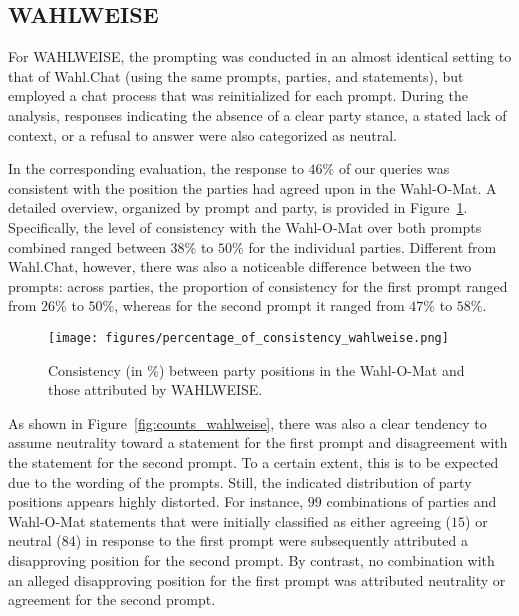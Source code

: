 \documentclass[
	fontsize=10pt,          %
	numbers=noenddot,    	%
    parskip=half,        	%
    listof=totoc,        	%
    bibliography=totoc,  	%
	headsepline=true,       %
	footsepline=false, 		%
    DIV=12                	%
]{scrartcl}
\begin{document}
\subsection{WAHLWEISE}


For WAHLWEISE, the prompting was conducted in an almost identical setting to that of Wahl.Chat (using the same prompts, parties, and statements), but employed a chat process that was reinitialized for each prompt. During the analysis, responses indicating the absence of a clear party stance, a stated lack of context, or a refusal to answer were also categorized as neutral.


In the corresponding evaluation, the response to $46\%$ of our queries was consistent with the position the parties had agreed upon in the Wahl-O-Mat. A detailed overview, organized by prompt and party, is provided in Figure~\ref{fig:consistency_wahlweise}. Specifically, the level of consistency with the Wahl-O-Mat over both prompts combined ranged between $38\%$ to $50\%$ for the individual parties. Different from Wahl.Chat, however, there was also a noticeable difference between the two prompts: across parties, the proportion of consistency for the first prompt ranged from $26\%$ to $50\%$, whereas for the second prompt it ranged from $47\%$ to $58\%$.

\begin{figure}[h]
    \centering
    \texttt{[image: figures/percentage\_of\_consistency\_wahlweise.png]}
    \caption{Consistency (in \%) between party positions in the Wahl-O-Mat and those attributed by WAHLWEISE.}
    \label{fig:consistency_wahlweise}
\end{figure}

As shown in Figure~\ref{fig:counts_wahlweise}, there was also a clear tendency to assume neutrality toward a statement for the first prompt and disagreement with the statement for the second prompt. To a certain extent, this is to be expected due to the wording of the prompts. Still, the indicated distribution of party positions appears highly distorted. For instance, $99$ combinations of parties and Wahl-O-Mat statements that were initially classified as either agreeing ($15$) or neutral ($84$) in response to the first prompt were subsequently attributed a disapproving position for the second prompt. By contrast, no combination with an alleged disapproving position for the first prompt was attributed neutrality or agreement for the second prompt.
\end{document}
